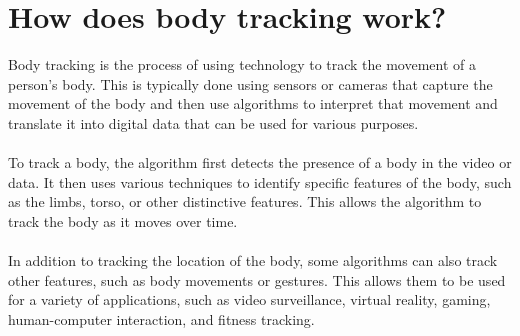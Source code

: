 \section{How does body tracking work?}
Body tracking is the process of using technology to track the movement of a person's body. This is typically done using sensors or cameras that capture the movement of the body and then use algorithms to interpret that movement and translate it into digital data that can be used for various purposes. 
\\
\\
To track a body, the algorithm first detects the presence of a body in the video or data. It then uses various techniques to identify specific features of the body, such as the limbs, torso, or other distinctive features. This allows the algorithm to track the body as it moves over time. 
\\
\\
In addition to tracking the location of the body, some algorithms can also track other features, such as body movements or gestures. This allows them to be used for a variety of applications, such as video surveillance, virtual reality, gaming, human-computer interaction, and fitness tracking.

